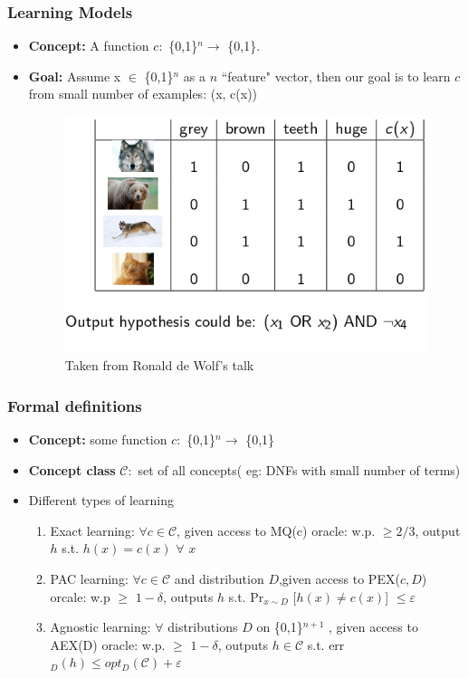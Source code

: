 \documentclass{beamer}
\begin{document}
\begin{frame}\frametitle{Learning Models}
\begin{itemize}
\item \textbf{Concept:} A function $c:$ \{0,1\}$^{n} \rightarrow$ \{0,1\}.
\item \textbf{Goal:} Assume x $\in$ \{0,1\}$^{n}$ as a $n$ ``feature" vector, then our goal is to learn $c$ from small number
 of examples: (x, c(x))

\begin{figure}
\includegraphics[scale=.9]{eg} 
\caption{Taken from Ronald de Wolf's talk}
\end{figure}

\end{itemize}
\end{frame}

\begin{frame}\frametitle{Formal definitions}
\begin{itemize}
\item \textbf{Concept:} some function $c:$ \{0,1\}$^{n} \rightarrow$ \{0,1\} 
\item \textbf{Concept class} $\mathcal{C}:$ set of all concepts( eg: DNFs with small number of terms)
\item Different types of learning

\begin{enumerate}
    \item Exact learning:  $\forall c \in \mathcal{C}$, given access to MQ(c) 
    oracle: w.p. $\geq 2/3$, output $h$ s.t. $h(x)=c(x)$ $\forall$ $x$  
    \item PAC learning: $\forall c \in \mathcal{C}$ and distribution $D$,given access to
    PEX($c, D$) orcale: w.p $\geq$ $1-\delta$, outputs $h$ s.t. Pr$_{x \sim   D}$ [$h(x) \neq c(x)$] $\leq \varepsilon$  
    \item Agnostic learning: $\forall$ distributions $D$ on \{0,1\}$^{n+1}$ 
    , given access to AEX(D) oracle: w.p. $\geq$ $1-\delta$, outputs $h \in \mathcal{C}$ s.t. err$_{D}(h) \leq opt_{D}(\mathcal{C}) + \varepsilon$
\end{enumerate}
 
\end{itemize}
\end{frame}
\end{document}
